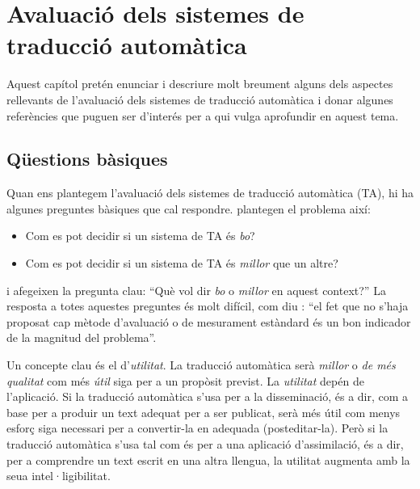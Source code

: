 \chapter{Avaluació dels sistemes de traducció automàtica}
\label{se:ASTA}

Aquest capítol pretén enunciar i descriure molt breument alguns dels
aspectes rellevants de l'avaluació dels sistemes de traducció
automàtica i donar algunes referències que puguen ser d'interés per a
qui vulga aprofundir en aquest tema.

\section{Qüestions bàsiques} 
Quan ens plantegem l'avaluació dels sistemes de traducció automàtica
(TA), hi ha algunes preguntes bàsiques que cal
respondre. \citet{arnold94b} plantegen el problema així:
\begin{itemize}
\item Com es pot decidir si un sistema de TA és \emph{bo}?
\item Com es pot decidir si un sistema de TA és \emph{millor} que un
  altre?
\end{itemize}
i afegeixen la pregunta clau: ``Què vol dir \emph{bo} o \emph{millor}
en aquest context?'' La resposta a totes aquestes preguntes és molt
difícil, com diu \citet{minnis94j}: ``el fet que no s'haja proposat
cap mètode d'avaluació o de mesurament estàndard és un bon indicador
de la magnitud del problema''.

Un concepte clau és el d'\emph{utilitat}. La traducció automàtica serà
\emph{millor} o \emph{de més qualitat} com més \emph{útil} siga per a
un propòsit previst. La \emph{utilitat} depén de l'aplicació. Si la
traducció automàtica s'usa per a la disseminació, és a dir, com a base
per a produir un text adequat per a ser publicat, serà més útil com
menys esforç siga necessari per a convertir-la en adequada
(posteditar-la). Però si la traducció automàtica s'usa tal com és per
a una aplicació d'assimilació, és a dir, per a comprendre un text
escrit en una altra llengua, la utilitat augmenta amb la seua
intel·ligibilitat.

